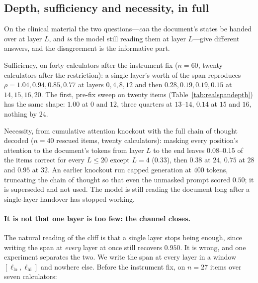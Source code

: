 \documentclass{article}
\begin{document}
\subsection{Depth, sufficiency and necessity, in full}
\label{app:depth}

\begin{table}[h]
\caption{Participation ratio of the document's span on Qwen3-8B, measured four
ways, medians over $36$ items (the plain column is bimodal, so its mean
describes no item). The first column is the quantity usually reported and the
only one that collapses. The last two columns say why: at layer $16$ one token
in $34$ of $40$ documents acquires a state $150$ times (median) the span's norm, carried by
two fixed hidden dimensions, and the top eight dimensions then hold $98\%$ of
the variance. Removing four positions out of four hundred, or normalising each
position to unit length, removes the collapse entirely.}
\label{tab:prdiag}
\centering
\small
\setlength{\tabcolsep}{4pt}

\end{table}


On the clinical material the two questions---\emph{can} the document's states be
handed over at layer $L$, and \emph{is} the model still reading them at layer
$L$---give different answers, and the disagreement is the informative part.

Sufficiency, on forty calculators after the instrument fix ($n=60$, twenty
calculators after the restriction): a single layer's worth of the span reproduces
$\rho = 1.04, 0.94, 0.85, 0.77$ at layers $0, 4, 8, 12$ and then
$0.28, 0.19, 0.19, 0.15$ at $14, 15, 16, 20$. The first, pre-fix sweep on twenty
items (Table~\ref{tab:realspandepth}) has the same shape: $1.00$ at $0$ and $12$,
three quarters at $13$--$14$, $0.14$ at $15$ and $16$, nothing by $24$.

Necessity, from cumulative attention knockout with the full chain of thought
decoded ($n=40$ rescued items, twenty calculators): masking every position's
attention to the document's tokens from layer $L$ to the end leaves
$0.08$--$0.15$ of the items correct for every $L \le 20$ except $L=4$ ($0.33$),
then $0.38$ at $24$, $0.75$ at $28$ and $0.95$ at $32$. An earlier knockout run
capped generation at 400 tokens, truncating the chain of thought so that even the
unmasked prompt scored $0.50$; it is superseded and not used. The model is still
reading the document long after a single-layer handover has stopped working.

\paragraph{It is not that one layer is too few: the channel closes.} The
natural reading of the cliff is that a single layer stops being enough, since
writing the span at \emph{every} layer at once still recovers $0.950$. It is
wrong, and one experiment separates the two. We write the span at every layer in
a window $[\ell_{\text{lo}}, \ell_{\text{hi}}]$ and nowhere else. Before the
instrument fix, on $n=27$ items over seven calculators:
\end{document}
